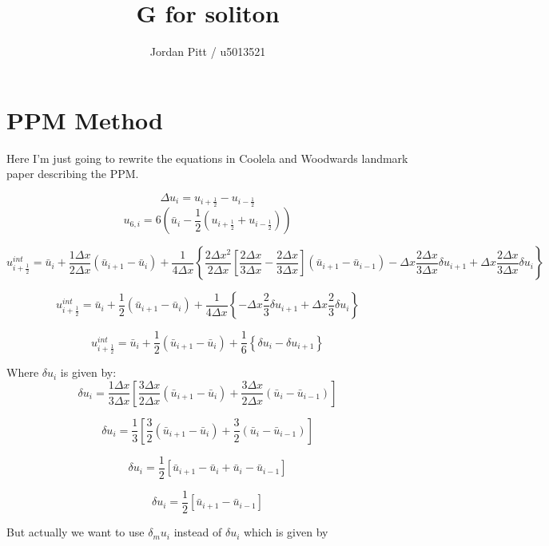 \documentclass[12pt]{article}
\begin{document}
\title{G for soliton}
\author{Jordan Pitt / u5013521}

\section{PPM Method}
Here I'm just going to rewrite the equations in Coolela and Woodwards landmark paper describing the PPM. 

\[\Delta u_i = u_{i + \frac{1}{2}} - u_{i - \frac{1}{2}}\]
\[u_{6,i} = 6\left(\bar{u}_i - \frac{1}{2}\left(u_{i + \frac{1}{2}} + u_{i - \frac{1}{2}}\right)\right)\]

\begin{dmath*}
u^{int}_{i+ \frac{1}{2}} = \bar{u}_i + \frac{1 \Delta x}{2\Delta x}\left(\bar{u}_{i+1} - \bar{u}_{i}\right) + \frac{1}{4\Delta x}\left\lbrace \frac{2 \Delta x^2}{2 \Delta x} \left[\frac{2 \Delta x}{3 \Delta x} - \frac{2 \Delta x}{3 \Delta x} \right] \left(\bar{u}_{i+1} - \bar{u}_{i-1}\right) - \Delta x \frac{2 \Delta x}{3 \Delta x} \delta u_{i+1} + \Delta x \frac{2 \Delta x}{3 \Delta x}\delta u_{i} \right\rbrace
\end{dmath*}

\begin{dmath*}
u^{int}_{i+ \frac{1}{2}} = \bar{u}_i + \frac{1}{2}\left(\bar{u}_{i+1} - \bar{u}_{i}\right) + \frac{1}{4\Delta x}\left\lbrace - \Delta x \frac{2}{3} \delta u_{i+1} + \Delta x \frac{2}{3}\delta u_{i} \right\rbrace
\end{dmath*}

\begin{dmath*}
u^{int}_{i+ \frac{1}{2}} = \bar{u}_i + \frac{1}{2}\left(\bar{u}_{i+1} - \bar{u}_{i}\right) + \frac{1}{6}\left\lbrace  \delta u_{i} - \delta u_{i+1} \right\rbrace
\end{dmath*}

Where $\delta u_i$ is given by:
\[\delta u_i = \frac{1 \Delta x}{3 \Delta x}\left[\frac{3 \Delta x}{2 \Delta x} \left(\bar{u}_{i+1} - \bar{u}_{i}\right) + \frac{3 \Delta x}{2 \Delta x} \left(\bar{u}_{i} - \bar{u}_{i-1}\right)\right]\]

\[\delta u_i = \frac{1}{3}\left[\frac{3}{2} \left(\bar{u}_{i+1} - \bar{u}_{i}\right) + \frac{3}{2} \left(\bar{u}_{i} - \bar{u}_{i-1}\right)\right]\]

\[\delta u_i = \frac{1}{2}\left[\bar{u}_{i+1} - \bar{u}_{i}  +\bar{u}_{i} - \bar{u}_{i-1}\right]\]

\[\delta u_i = \frac{1}{2}\left[\bar{u}_{i+1} - \bar{u}_{i-1}\right]\]

But actually we want to use $\delta_m u_i$ instead of $\delta u_i$ which is given by
\end{document}
